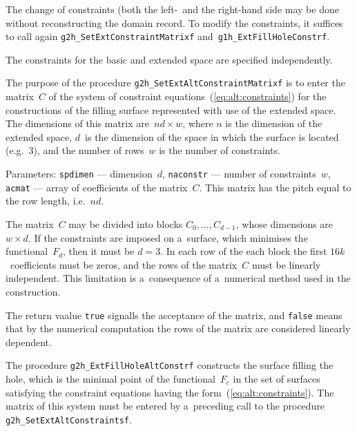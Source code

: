 The change of constraints (both the left-~and the right-hand side
may be done without reconstructing the domain record. To modify the constraints,
it suffices to call again \texttt{g2h\_SetExtConstraintMatrixf}
and~\texttt{g1h\_ExtFillHoleConstrf}.

The constraints for the basic and extended space are specified independently.

\vspace{\bigskipamount}
\begin{sloppypar}
The purpose of the procedure \texttt{g2h\_SetExtAltConstraintMatrixf} is
to enter the matrix~$C$ of the system of constraint
equations~(\ref{eq:alt:constraints}) for the constructions of the filling
surface represented with use of the extended space. The dimensions of
this matrix are~$nd\times w$, where $n$ is the dimension of the extended
space, $d$~is the dimension of the space in which the surface is located
(e.g.~$3$), and the number of rows~$w$ is the number of constraints.%
\end{sloppypar}

Parameters: \texttt{spdimen} --- dimension~$d$, \texttt{naconstr} --- number
of constraints~$w$, \texttt{acmat} --- array of coefficients of the matrix~$C$.
This matrix has the pitch equal to the row length, i.e.~$nd$.

The matrix~$C$ may be divided into blocks $C_0,\ldots,C_{d-1}$, whose dimensions
are $w\times d$. If the constraints are imposed on a~surface, which minimises
the functional~$F_d$, then it must be $d=3$. In each row of the each block
the first $16k$~coefficients must be zeros, and the rows of the matrix~$C$
must be linearly independent. This limitation is a~consequence of
a~numerical method used in the construction.

The return vaalue \texttt{true} signalls the acceptance of the matrix,
and  \texttt{false} means that by the numerical computation the rows of
the matrix are considered linearly dependent.

\vspace{\bigskipamount}
The procedure \texttt{g2h\_ExtFillHoleAltConstrf} constructs the surface
filling the hole, which is the minimal point of the functional~$F_c$ in the set
of surfaces satisfying the constraint equations having the
form~(\ref{eq:alt:constraints}).
The matrix of this system must be entered by a~preceding call to the procedure
\texttt{g2h\_SetExtAltConstraintsf}.

